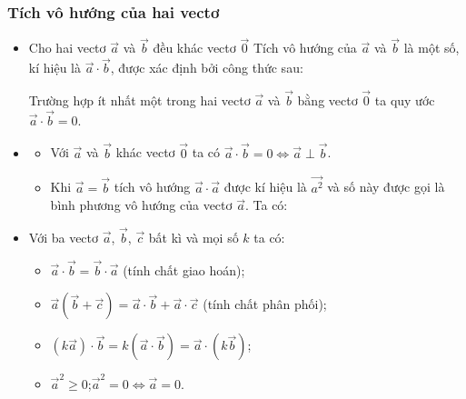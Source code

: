 \subsubsection{Tích vô hướng của hai vectơ}
\begin{itemize}
    \item [\iconMT] Cho hai vectơ $\overrightarrow{a}$ và $\overrightarrow{b}$ đều khác vectơ $\overrightarrow{0}$ Tích vô hướng của $\overrightarrow{a}$ và $\overrightarrow{b}$ là một số, kí hiệu là $\overrightarrow{a}\cdot\overrightarrow{b}$, được xác định bởi công thức sau:
          \begin{note}
              Trường hợp ít nhất một trong hai vectơ $\overrightarrow{a}$ và $\overrightarrow{b}$ bằng vectơ $\vec{0}$ ta quy ước $\overrightarrow{a}\cdot\overrightarrow{b}=0$.
          \end{note}
    \item [\iconMT] 
          \begin{itemize}
              \item Với $\overrightarrow{a}$ và $\overrightarrow{b}$ khác vectơ $\overrightarrow{0}$ ta có $\overrightarrow{a}\cdot\overrightarrow{b}=0\Leftrightarrow \overrightarrow{a}\perp \overrightarrow{b}$.
              \item Khi $\overrightarrow{a}=\overrightarrow{b}$ tích vô hướng $\overrightarrow{a}\cdot\overrightarrow{a}$ được kí hiệu là $\overrightarrow{a^2}$ và số này được gọi là bình phương vô hướng của vectơ $\overrightarrow{a}$. Ta có:
          \end{itemize}
    \item [\iconMT] 
          Với ba vectơ $\overrightarrow{a}$, $\overrightarrow{b}$, $\overrightarrow{c}$ bất kì và mọi số $k$ ta có:
          \begin{tcolorbox}[colframe=orange,colback=white,boxrule=0.2mm]
              \begin{itemize}
                  \item $\overrightarrow{a}\cdot \overrightarrow{b}=\overrightarrow{b}\cdot \overrightarrow{a}$ (tính chất giao hoán);
                  \item $\overrightarrow{a}\left(\overrightarrow{b}+\overrightarrow{c}\right)=\overrightarrow{a}\cdot \overrightarrow{b}+\overrightarrow{a}\cdot \overrightarrow{c}$ (tính chất phân phối);
                  \item $(k\overrightarrow{a})\cdot \overrightarrow{b}=k(\overrightarrow{a}\cdot \overrightarrow{b})=\overrightarrow{a}\cdot (k\overrightarrow{b})$;
                  \item $\overrightarrow{a}^2\ge 0$;\quad $\overrightarrow{a}^2=0\Leftrightarrow \overrightarrow{a}=0$.
              \end{itemize}
          \end{tcolorbox}
\end{itemize}
